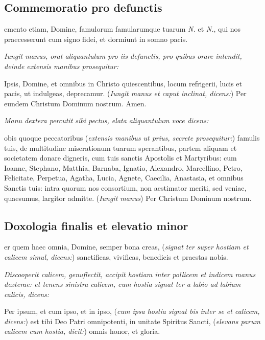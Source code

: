\subsection{Commemoratio pro defunctis}

emento etiam, Domine, famulorum famularumque tuarum \textit{N.} et
\textit{N.}, qui nos praecesserunt cum signo fidei, et dormiunt in somno pacis.

\textit{%
    Iungit manus, orat aliquantulum pro iis defunctis, pro quibus orare
    intendit, deinde extensis manibus prosequitur:
}

Ipsis, Domine, et omnibus in Christo quiescentibus, locum refrigerii, lucis et
pacis, ut indulgeas, deprecamur.  (\textit{Iungit manus et caput inclinat,
dicens:}) Per eundem Christum Dominum nostrum.  Amen.

\textit{Manu dextera percutit sibi pectus, elata aliquantulum voce dicens:}

obis quoque peccatoribus (\textit{extensis manibus ut prius,
secrete prosequitur:}) famulis tuis, de multitudine miserationum tuarum
sperantibus, partem aliquam et societatem donare digneris, cum tuis sanctis
Apostolis et Martyribus: cum Ioanne, Stephano, Matthia, Barnaba, Ignatio,
Alexandro, Marcellino, Petro, Felicitate, Perpetua, Agatha, Lucia, Agnete,
Caecilia, Anastasia, et omnibus Sanctis tuis: intra quorum nos consortium, non
aestimator meriti, sed veniae, quaesumus, largitor admitte.  (\textit{Iungit
manus}) Per Christum Dominum nostrum.

\subsection{Doxologia finalis et elevatio minor}

er quem haec omnia, Domine, semper bona creas, (\textit{signat ter
super hostiam et calicem simul, dicens:}) sancti\cross{}ficas,
vivi\cross{}ficas, bene\cross{}dicis et praestas nobis.

\textit{%
    Discooperit calicem, genuflectit, accipit hostiam inter pollicem et indicem
    manus dexterae: et tenens sinistra calicem, cum hostia signat ter a labio ad
    labium calicis, dicens:
}

Per ip\cross{}sum, et cum ip\cross{}so, et in ip\cross{}so, (\textit{cum ipsa
hostia signat bis inter se et calicem, dicens:}) est tibi Deo Patri \cross{}
omnipotenti, in unitate Spiritus \cross{} Sancti, (\textit{elevans parum calicem
cum hostia, dicit:}) omnis honor, et gloria.

